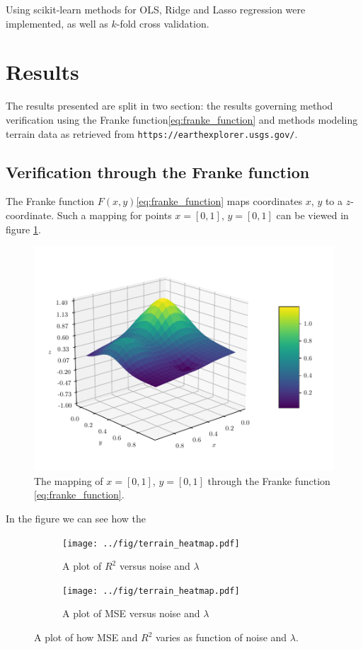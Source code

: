 \documentclass[11pt]{article}
\begin{document}
Using scikit-learn\cite{scikit-learn} methods for OLS, Ridge and Lasso regression were implemented, as well as $k$-fold cross validation.

\section{Results}
The results presented are split in two section: the results governing method verification using the Franke function\eqref{eq:franke_function} and methods modeling terrain data as retrieved from \texttt{https://earthexplorer.usgs.gov/}.

\subsection{Verification through the Franke function}
The Franke function $F(x,y)$\eqref{eq:franke_function} maps coordinates $x$, $y$ to a $z$-coordinate. Such a mapping for points $x=[0,1]$, $y=[0,1]$ can be viewed in figure \ref{fig:franke_function}.
\begin{figure}
    \centering
    \includegraphics[scale=1.0]{../fig/franke_function.pdf}
    \caption{The mapping of $x=[0,1]$, $y=[0,1]$ through the Franke function \eqref{eq:franke_function}.}
    \label{fig:franke_function}
\end{figure}

In the figure we can see how the 
\begin{figure}
    \centering
    \begin{subfigure}[b]{0.5\textwidth}
        \centering
        \texttt{[image: ../fig/terrain\_heatmap.pdf]}
        \caption{A plot of $R^2$ versus noise and $\lambda$}
        \label{fig:r2_terrain_heatmap}
    \end{subfigure}%
    \begin{subfigure}[b]{0.5\textwidth}
        \centering
        \texttt{[image: ../fig/terrain\_heatmap.pdf]}
        \caption{A plot of MSE versus noise and $\lambda$}
        \label{fig:mse_terrain_heatmap}
    \end{subfigure}
    \caption{A plot of how MSE and $R^2$ varies as function of noise and $\lambda$.}
    \label{fig:mse_r2_heatmaps_terrain}
\end{figure}
\end{document}
